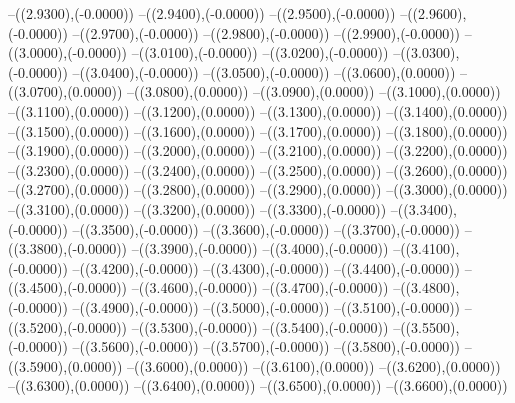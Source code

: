 {	--({\sx*(2.9300)},{\sy*(-0.0000)})
	--({\sx*(2.9400)},{\sy*(-0.0000)})
	--({\sx*(2.9500)},{\sy*(-0.0000)})
	--({\sx*(2.9600)},{\sy*(-0.0000)})
	--({\sx*(2.9700)},{\sy*(-0.0000)})
	--({\sx*(2.9800)},{\sy*(-0.0000)})
	--({\sx*(2.9900)},{\sy*(-0.0000)})
	--({\sx*(3.0000)},{\sy*(-0.0000)})
	--({\sx*(3.0100)},{\sy*(-0.0000)})
	--({\sx*(3.0200)},{\sy*(-0.0000)})
	--({\sx*(3.0300)},{\sy*(-0.0000)})
	--({\sx*(3.0400)},{\sy*(-0.0000)})
	--({\sx*(3.0500)},{\sy*(-0.0000)})
	--({\sx*(3.0600)},{\sy*(0.0000)})
	--({\sx*(3.0700)},{\sy*(0.0000)})
	--({\sx*(3.0800)},{\sy*(0.0000)})
	--({\sx*(3.0900)},{\sy*(0.0000)})
	--({\sx*(3.1000)},{\sy*(0.0000)})
	--({\sx*(3.1100)},{\sy*(0.0000)})
	--({\sx*(3.1200)},{\sy*(0.0000)})
	--({\sx*(3.1300)},{\sy*(0.0000)})
	--({\sx*(3.1400)},{\sy*(0.0000)})
	--({\sx*(3.1500)},{\sy*(0.0000)})
	--({\sx*(3.1600)},{\sy*(0.0000)})
	--({\sx*(3.1700)},{\sy*(0.0000)})
	--({\sx*(3.1800)},{\sy*(0.0000)})
	--({\sx*(3.1900)},{\sy*(0.0000)})
	--({\sx*(3.2000)},{\sy*(0.0000)})
	--({\sx*(3.2100)},{\sy*(0.0000)})
	--({\sx*(3.2200)},{\sy*(0.0000)})
	--({\sx*(3.2300)},{\sy*(0.0000)})
	--({\sx*(3.2400)},{\sy*(0.0000)})
	--({\sx*(3.2500)},{\sy*(0.0000)})
	--({\sx*(3.2600)},{\sy*(0.0000)})
	--({\sx*(3.2700)},{\sy*(0.0000)})
	--({\sx*(3.2800)},{\sy*(0.0000)})
	--({\sx*(3.2900)},{\sy*(0.0000)})
	--({\sx*(3.3000)},{\sy*(0.0000)})
	--({\sx*(3.3100)},{\sy*(0.0000)})
	--({\sx*(3.3200)},{\sy*(0.0000)})
	--({\sx*(3.3300)},{\sy*(-0.0000)})
	--({\sx*(3.3400)},{\sy*(-0.0000)})
	--({\sx*(3.3500)},{\sy*(-0.0000)})
	--({\sx*(3.3600)},{\sy*(-0.0000)})
	--({\sx*(3.3700)},{\sy*(-0.0000)})
	--({\sx*(3.3800)},{\sy*(-0.0000)})
	--({\sx*(3.3900)},{\sy*(-0.0000)})
	--({\sx*(3.4000)},{\sy*(-0.0000)})
	--({\sx*(3.4100)},{\sy*(-0.0000)})
	--({\sx*(3.4200)},{\sy*(-0.0000)})
	--({\sx*(3.4300)},{\sy*(-0.0000)})
	--({\sx*(3.4400)},{\sy*(-0.0000)})
	--({\sx*(3.4500)},{\sy*(-0.0000)})
	--({\sx*(3.4600)},{\sy*(-0.0000)})
	--({\sx*(3.4700)},{\sy*(-0.0000)})
	--({\sx*(3.4800)},{\sy*(-0.0000)})
	--({\sx*(3.4900)},{\sy*(-0.0000)})
	--({\sx*(3.5000)},{\sy*(-0.0000)})
	--({\sx*(3.5100)},{\sy*(-0.0000)})
	--({\sx*(3.5200)},{\sy*(-0.0000)})
	--({\sx*(3.5300)},{\sy*(-0.0000)})
	--({\sx*(3.5400)},{\sy*(-0.0000)})
	--({\sx*(3.5500)},{\sy*(-0.0000)})
	--({\sx*(3.5600)},{\sy*(-0.0000)})
	--({\sx*(3.5700)},{\sy*(-0.0000)})
	--({\sx*(3.5800)},{\sy*(-0.0000)})
	--({\sx*(3.5900)},{\sy*(0.0000)})
	--({\sx*(3.6000)},{\sy*(0.0000)})
	--({\sx*(3.6100)},{\sy*(0.0000)})
	--({\sx*(3.6200)},{\sy*(0.0000)})
	--({\sx*(3.6300)},{\sy*(0.0000)})
	--({\sx*(3.6400)},{\sy*(0.0000)})
	--({\sx*(3.6500)},{\sy*(0.0000)})
	--({\sx*(3.6600)},{\sy*(0.0000)})
}
